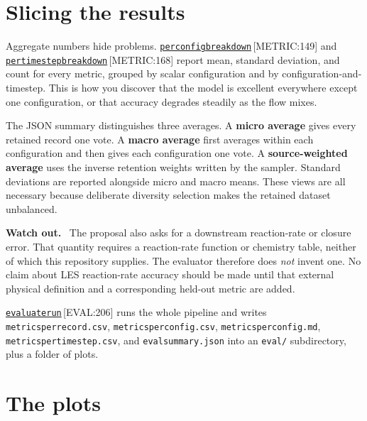\documentclass[11pt,a4paper]{report}
\newcommand{\srcbase}{vscode://file/Users/syellapa/Documents/Research/2026/ANSYS/Multi-ScalarPDF}
\newcommand{\dmdn}{dirichlet\string_mdn}
\newcommand{\srctag}[1]{{\footnotesize\textcolor{TagGray}{[#1]}}}
\newcommand{\Eval}[2]{\href{\srcbase/\dmdn/evaluate.py:#1}{\texttt{#2}}\,\srctag{EVAL:#1}}
\newcommand{\Metric}[2]{\href{\srcbase/\dmdn/metrics.py:#1}{\texttt{#2}}\,\srctag{METRIC:#1}}
\newcommand{\code}[1]{\texttt{#1}}
\newcommand{\term}[1]{\textbf{#1}}
\renewcommand{\_}{\origtextunderscore\allowbreak}
\newlength{\calloutwidth}
\newcommand{\calloutOpen}{%
  \par\medskip\noindent
  \setlength{\calloutwidth}{\dimexpr\linewidth-2\fboxsep\relax}%
  \begin{lrbox}{\calloutbox}\begin{minipage}{\calloutwidth}}
\newcommand{\calloutClose}[1]{%
  \end{minipage}\end{lrbox}\colorbox{#1}{\usebox{\calloutbox}}\par\medskip}
\newenvironment{caution}
  {\calloutOpen\textbf{Watch out.}\ }
  {\calloutClose{WarnBG}}
\begin{document}
\section{Slicing the results}

Aggregate numbers hide problems. \Metric{149}{per\_config\_breakdown} and
\Metric{168}{per\_timestep\_breakdown} report mean, standard deviation, and count for every
metric, grouped by scalar configuration and by configuration-and-timestep. This is how you
discover that the model is excellent everywhere except one configuration, or that accuracy
degrades steadily as the flow mixes.

The JSON summary distinguishes three averages. A \term{micro average} gives every retained
record one vote. A \term{macro average} first averages within each configuration and then gives
each configuration one vote. A \term{source-weighted average} uses the inverse retention
weights written by the sampler. Standard deviations are reported alongside micro and macro
means. These views are all necessary because deliberate diversity selection makes the retained
dataset unbalanced.

\begin{caution}
The proposal also asks for a downstream reaction-rate or closure error. That quantity requires
a reaction-rate function or chemistry table, neither of which this repository supplies.
The evaluator therefore does \emph{not} invent one. No claim about LES reaction-rate accuracy
should be made until that external physical definition and a corresponding held-out metric are
added.
\end{caution}

\Eval{206}{evaluate\_run} runs the whole pipeline and writes
\code{metrics\_per\_record.csv}, \code{metrics\_per\_config.csv},
\code{metrics\_per\_config.md}, \code{metrics\_per\_timestep.csv}, and
\code{eval\_summary.json} into an \code{eval/} subdirectory, plus a folder of plots.

\section{The plots}
\end{document}
